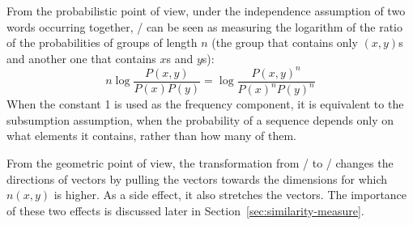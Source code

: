 


From the probabilistic point of view, under the independence assumption of two words occurring together, \NPMI/ can be seen as measuring the logarithm of the ratio of the probabilities of groups of length $n$ (the group that contains only $(x,y)$s and another one that contains $x$s and $y$s):
%
\begin{equation*}
  n\log\frac{P(x, y)}{P(x)P(y)} = \log\frac{P(x, y)^{n}}{P(x)^{n}P(y)^{n}}
\end{equation*}
%
When the constant 1 is used as the frequency component, it is equivalent to the subsumption assumption, when the probability of a sequence depends only on what elements it contains, rather than how many of them.

From the geometric point of view, the transformation from \PMI/ to \NPMI/ changes the directions of vectors by pulling the vectors towards the dimensions for which $n(x, y)$ is higher. As a side effect, it also stretches the vectors. The importance of these two effects is discussed later in Section~\ref{sec:similarity-measure}.

